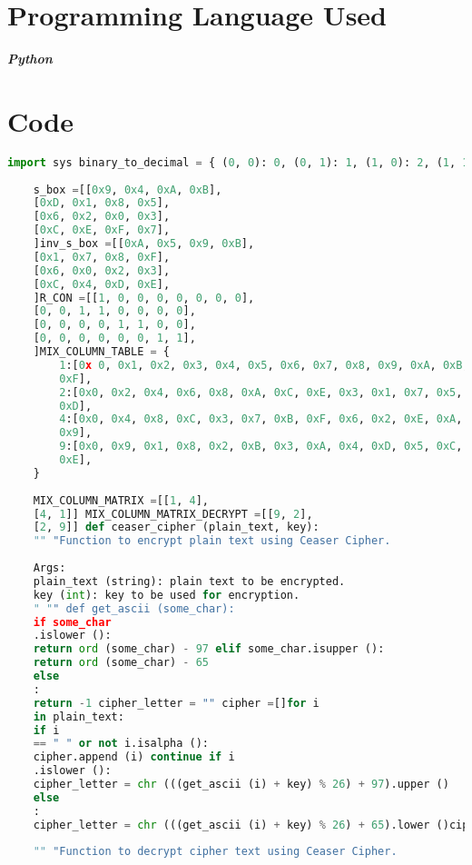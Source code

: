 \documentclass{article}
\begin{document}
\section{\textbf{Programming Language Used}}
\textbf{\textit{Python}}
\section{\textbf{Code}}
\begin{lstlisting}[language=python, caption={Input Code}]
	import sys binary_to_decimal = { (0, 0): 0, (0, 1): 1, (1, 0): 2, (1, 1):3 }
	
	s_box =[[0x9, 0x4, 0xA, 0xB],
	[0xD, 0x1, 0x8, 0x5],
	[0x6, 0x2, 0x0, 0x3],
	[0xC, 0xE, 0xF, 0x7],
	]inv_s_box =[[0xA, 0x5, 0x9, 0xB],
	[0x1, 0x7, 0x8, 0xF],
	[0x6, 0x0, 0x2, 0x3],
	[0xC, 0x4, 0xD, 0xE],
	]R_CON =[[1, 0, 0, 0, 0, 0, 0, 0],
	[0, 0, 1, 1, 0, 0, 0, 0],
	[0, 0, 0, 0, 1, 1, 0, 0],
	[0, 0, 0, 0, 0, 0, 1, 1],
	]MIX_COLUMN_TABLE = {
		1:[0x 0, 0x1, 0x2, 0x3, 0x4, 0x5, 0x6, 0x7, 0x8, 0x9, 0xA, 0xB, 0xC, 0xD, 0xE,
		0xF],
		2:[0x0, 0x2, 0x4, 0x6, 0x8, 0xA, 0xC, 0xE, 0x3, 0x1, 0x7, 0x5, 0xB, 0x9, 0xF,
		0xD],
		4:[0x0, 0x4, 0x8, 0xC, 0x3, 0x7, 0xB, 0xF, 0x6, 0x2, 0xE, 0xA, 0x5, 0x1, 0xD,
		0x9],
		9:[0x0, 0x9, 0x1, 0x8, 0x2, 0xB, 0x3, 0xA, 0x4, 0xD, 0x5, 0xC, 0x6, 0xF, 0x7,
		0xE],
	}
	
	MIX_COLUMN_MATRIX =[[1, 4],
	[4, 1]] MIX_COLUMN_MATRIX_DECRYPT =[[9, 2],
	[2, 9]] def ceaser_cipher (plain_text, key):
	"" "Function to encrypt plain text using Ceaser Cipher.
	
	Args:
	plain_text (string): plain text to be encrypted. 
	key (int): key to be used for encryption.
	" "" def get_ascii (some_char):
	if some_char
	.islower ():
	return ord (some_char) - 97 elif some_char.isupper ():
	return ord (some_char) - 65
	else
	:
	return -1 cipher_letter = "" cipher =[]for i
	in plain_text:
	if i
	== " " or not i.isalpha ():
	cipher.append (i) continue if i
	.islower ():
	cipher_letter = chr (((get_ascii (i) + key) % 26) + 97).upper ()
	else
	:
	cipher_letter = chr (((get_ascii (i) + key) % 26) + 65).lower ()cipher.append (cipher_letter) return cipher def decrypt_ceaser_cipher (cipher_text, ceaser_key):
	
	"" "Function to decrypt cipher text using Ceaser Cipher.
	

\end{lstlisting}
\end{document}
